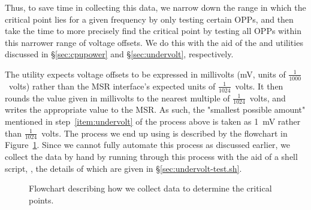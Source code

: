 Thus, to save time in collecting this data, we narrow down the range in which
the critical point lies for a given frequency by only testing certain OPPs, and
then take the time to more precisely find the critical point by testing all OPPs
within this narrower range of voltage offsets. We do this with the aid of the
 and  utilities discussed in §\ref{sec:cpupower}
and §\ref{sec:undervolt}, respectively.

The  utility expects voltage offsets to be expressed in
millivolts (mV, units of $\frac{1}{1000}$~volts) rather than the MSR interface's
expected units of $\frac{1}{1024}$~volts. It then rounds the value given in
millivolts to the nearest multiple of $\frac{1}{1024}$~volts, and writes the
appropriate value to the MSR. As such, the "smallest possible amount" mentioned
in step~\ref{item:undervolt} of the process above is taken as 1~mV rather than
$\frac{1}{1024}$~volts. The process we end up using is described by the
flowchart in Figure~\ref{fig:data-collection-flowchart}. Since we cannot fully
automate this process as discussed earlier, we collect the data by hand by
running through this process with the aid of a shell script,
, the details of which are given in
§\ref{sec:undervolt-test.sh}.

\begin{figure}[!htb]
    \caption{
        \label{fig:data-collection-flowchart}
        Flowchart describing how we collect data to determine the critical
        points.
    }
\end{figure}

